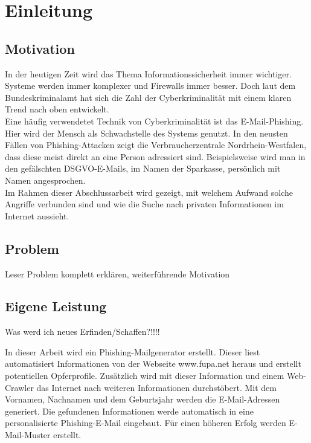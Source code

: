 \chapter{Einleitung}
\label{cha:einleitung}


\section{Motivation}
\label {sec:Motivation}
In der heutigen Zeit wird das Thema Informationssicherheit immer wichtiger. Systeme werden immer komplexer und Firewalls immer besser.
Doch laut dem Bundeskriminalamt hat sich die Zahl der Cyberkriminalität mit einem klaren Trend nach oben entwickelt. \cite{Cyberkriminalitaet}\\
Eine häufig verwendetet Technik von Cyberkriminalität ist das E-Mail-Phishing. Hier wird der Mensch als Schwachstelle des Systems genutzt. In den neusten Fällen von Phishing-Attacken zeigt die Verbraucherzentrale Nordrhein-Westfalen, dass diese meist direkt an eine Person adressiert sind. Beispielsweise wird man in den gefälschten DSGVO-E-Mails, im Namen der Sparkasse, persönlich mit Namen angesprochen. \cite{VerbraucherzentraleNW} \\
Im Rahmen dieser Abschlussarbeit wird gezeigt, mit welchem Aufwand solche Angriffe verbunden sind und wie die Suche nach privaten Informationen im Internet aussieht.

\section{Problem}
Leser Problem komplett erklären, weiterführende Motivation


\section{Eigene Leistung}
\label {sec:Leistung} 
Was werd ich neues Erfinden/Schaffen?!!!!

In dieser Arbeit wird ein Phishing-Mailgenerator erstellt. Dieser liest automatisiert Informationen von der Webseite www.fupa.net heraus und erstellt potentiellen Opferprofile. Zusätzlich wird mit dieser Information und einem Web-Crawler das Internet nach weiteren Informationen durchstöbert. Mit dem Vornamen, Nachnamen und dem Geburtsjahr werden die E-Mail-Adressen generiert. Die gefundenen Informationen werde automatisch in eine personalisierte Phishing-E-Mail eingebaut. Für einen höheren Erfolg werden E-Mail-Muster erstellt.


